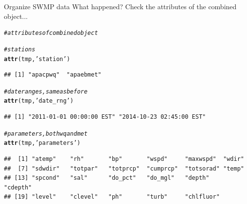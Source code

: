 \documentclass[xcolor=svgnames]{beamer}\usepackage[]{graphicx}\usepackage[]{color}
\makeatletter
\newcommand{\hlstr}[1]{\textcolor[rgb]{0.192,0.494,0.8}{#1}}%
\newcommand{\hlcom}[1]{\textcolor[rgb]{0.678,0.584,0.686}{\textit{#1}}}%
\newcommand{\hlstd}[1]{\textcolor[rgb]{0.345,0.345,0.345}{#1}}%
\newcommand{\hlkwd}[1]{\textcolor[rgb]{0.737,0.353,0.396}{\textbf{#1}}}%
\newenvironment{kframe}{%
 \def\at@end@of@kframe{}%
 \ifinner\ifhmode%
  \def\at@end@of@kframe{\end{minipage}}%
  \begin{minipage}{\columnwidth}%
 \fi\fi%
 \def\FrameCommand##1{\hskip\@totalleftmargin \hskip-\fboxsep
 \colorbox{shadecolor}{##1}\hskip-\fboxsep
     \hskip-\linewidth \hskip-\@totalleftmargin \hskip\columnwidth}%
 \MakeFramed {\advance\hsize-\width
   \@totalleftmargin\z@ \linewidth\hsize
   \@setminipage}}%
 {\par\unskip\endMakeFramed%
 \at@end@of@kframe}
\newenvironment{knitrout}{}{} %
\makeatother
\begin{document}
\begin{frame}[containsverbatim]{Organize SWMP data}
What happened?  Check the attributes of the combined object...
\begin{knitrout}\scriptsize
{}\color{fgcolor}\begin{kframe}
\begin{alltt}
\hlcom{# attributes of combined object}

\hlcom{# stations }
\hlkwd{attr}\hlstd{(tmp,} \hlstr{'station'}\hlstd{)}
\end{alltt}
\begin{verbatim}
## [1] "apacpwq"  "apaebmet"
\end{verbatim}
\begin{alltt}
\hlcom{# date ranges, same as before}
\hlkwd{attr}\hlstd{(tmp,} \hlstr{'date_rng'}\hlstd{)}
\end{alltt}
\begin{verbatim}
## [1] "2011-01-01 00:00:00 EST" "2014-10-23 02:45:00 EST"
\end{verbatim}
\begin{alltt}
\hlcom{# parameters, both wq and met}
\hlkwd{attr}\hlstd{(tmp,} \hlstr{'parameters'}\hlstd{)}
\end{alltt}
\begin{verbatim}
##  [1] "atemp"    "rh"       "bp"       "wspd"     "maxwspd"  "wdir"    
##  [7] "sdwdir"   "totpar"   "totprcp"  "cumprcp"  "totsorad" "temp"    
## [13] "spcond"   "sal"      "do_pct"   "do_mgl"   "depth"    "cdepth"  
## [19] "level"    "clevel"   "ph"       "turb"     "chlfluor"
\end{verbatim}
\end{kframe}
\end{knitrout}
\end{frame}
\end{document}
